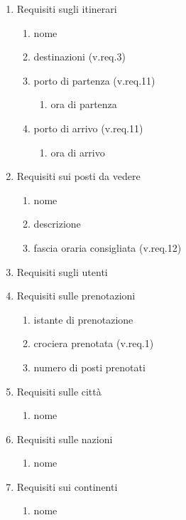 \documentclass{article}
\begin{document}
\begin{enumerate}
\begin{enumerate}
    \end{enumerate}
    \item Requisiti sugli itinerari
    \begin{enumerate}
        \item nome
        \item destinazioni (v.req.3)
        \item porto di partenza (v.req.11)
        \begin{enumerate}
            \item ora di partenza
        \end{enumerate}
        \item porto di arrivo (v.req.11)
        \begin{enumerate}
            \item ora di arrivo
        \end{enumerate}
    \end{enumerate}
    \item Requisiti sui posti da vedere
    \begin{enumerate}
        \item nome
        \item descrizione
        \item fascia oraria consigliata (v.req.12)
    \end{enumerate}
    \item Requisiti sugli utenti
    \item Requisiti sulle prenotazioni
    \begin{enumerate}
        \item istante di prenotazione
        \item crociera prenotata (v.req.1)
        \item numero di posti prenotati
    \end{enumerate}
    \item Requisiti sulle città
    \begin{enumerate}
        \item nome
    \end{enumerate}
    \item Requisiti sulle nazioni
    \begin{enumerate}
        \item nome
    \end{enumerate}
    \item Requisiti sui continenti
    \begin{enumerate}
        \item nome

\end{enumerate}
\end{enumerate}
\end{document}
